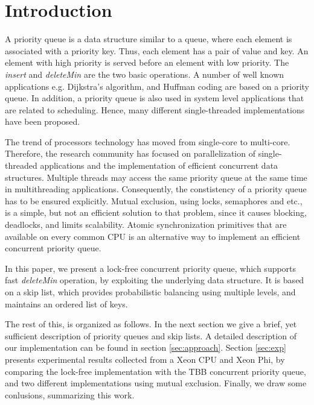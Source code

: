 \section{Introduction}\label{sec:intro}

A priority queue is a data structure similar to a queue, where each element is associated with a priority key.
Thus, each element has a pair of value and key.
An element with high priority is served before an element with low priority.
The \textit{insert} and \textit{deleteMin} are the two basic operations.
A number of well known applications e.g. Dijkstra's algorithm, and Huffman coding are based on a priority queue.
In addition, a priority queue is also used in system level applications that are related to scheduling.
Hence, many different single-threaded implementations have been proposed.

The trend of processors technology has moved from single-core to multi-core.
Therefore, the research community has focused on parallelization of single-threaded applications and the implementation of efficient concurrent data structures.
Multiple threads may access the same priority queue at the same time in multithreading applications.
Consequently, the constistency of a priority queue has to be ensured explicitly.
Mutual exclusion, using locks, semaphores and etc., is a simple, but not an efficient solution to that problem, since it causes blocking, deadlocks, and limits scalability.
Atomic synchronization primitives that are available on every common CPU is an alternative way to implement an efficient concurrent priority queue.

In this paper, we present a lock-free concurrent priority queue, which supports fast \textit{deleteMin} operation, by exploiting the underlying data structure.
It is based on a skip list, which provides probabilistic balancing using multiple levels, and maintains an ordered list of keys.


The rest of this, is organized as follows.
In the next section we give a brief, yet sufficient description of priority queues and skip lists. 
A detailed description of our implementation can be found in section \ref{sec:approach}.
Section \ref{sec:exp} presents experimental results collected from a Xeon CPU and Xeon Phi, by comparing the lock-free implementation with the TBB concurrent priority queue, and two different implementations using mutual exclusion.
Finally, we draw some conlusions, summarizing this work.

